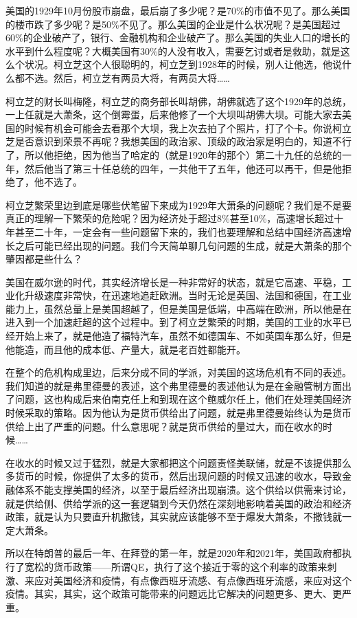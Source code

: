 \documentclass[UTF8, 12pt, a4paper]{ctexrep}
\begin{document}
美国的1929年10月份股市崩盘，最后崩了多少呢？是70\%的市值不见了。那么美国的楼市跌了多少呢？是50\%不见了。那么美国的企业是什么状况呢？是美国超过60\%的企业破产了，银行、金融机构和企业破产了。那么美国的失业人口的增长的水平到什么程度呢？大概美国有30\%的人没有收入，需要乞讨或者是救助，就是这么个状况。柯立芝这个人很聪明的，柯立芝到1928年的时候，别人让他选，他说什么都不选。然后，柯立芝有两员大将，有两员大将……

柯立芝的财长叫梅隆，柯立芝的商务部长叫胡佛，胡佛就选了这个1929年的总统，一上任就是大萧条，这个倒霉蛋，后来他修了一个大坝叫胡佛大坝。可能大家去美国的时候有机会可能会去看那个大坝，我上次去拍了个照片，打了个卡。你说柯立芝是否意识到荣景不再呢？我想美国的政治家、顶级的政治家是明白的，知道不行了，所以他拒绝，因为他当了哈定的（就是1920年的那个）第二十九任的总统的一年，然后他当了第三十任总统的四年，一共他干了五年，他还可以再干，但是他拒绝了，他不选了。

柯立芝繁荣里边到底是哪些伏笔留下来成为1929年大萧条的问题呢？我们是不是要真正的理解一下繁荣的危险呢？因为经济处于超过8\%甚至10\%，高速增长超过十年甚至二十年，一定会有一些问题留下来的，我们也要理解和总结中国经济高速增长之后可能已经出现的问题。我们今天简单聊几句问题的生成，就是大萧条的那个肇因都是些什么？

美国在威尔逊的时代，其实经济增长是一种非常好的状态，就是它高速、平稳，工业化升级速度非常快，在迅速地追赶欧洲。当时无论是英国、法国和德国，在工业能力上，虽然总量上是美国超越了，但是美国是低端，中高端在欧洲，所以他是在进入到一个加速赶超的这个过程中。到了柯立芝繁荣的时期，美国的工业的水平已经开始上来了，就是他造了福特汽车，虽然不如德国车、不如英国车那么好，但是他能造，而且他的成本低、产量大，就是老百姓都能开。

在整个的危机构成里边，后来分成不同的学派，对美国的这场危机有不同的表述。我们知道的就是弗里德曼的表述，这个弗里德曼的表述他认为是在金融管制方面出了问题，这也构成后来伯南克任上和到现在这个鲍威尔任上，他们在处理美国经济时候采取的策略。因为他认为是货币供给出了问题，就是弗里德曼始终认为是货币供给上出了严重的问题。什么意思呢？就是货币供给的量过大，而在收水的时候……

在收水的时候又过于猛烈，就是大家都把这个问题责怪美联储，就是不该提供那么多货币的时候，你提供了太多的货币，然后出现问题的时候又迅速的收水，导致金融体系不能支撑美国的经济，以至于最后经济出现崩溃。这个供给以供需来讨论，就是供给侧、供给学派的这一套逻辑到今天仍然在深刻地影响着美国的政治和经济政策，就是认为只要直升机撒钱，其实就应该能够不至于爆发大萧条，不撒钱就一定大萧条。

所以在特朗普的最后一年、在拜登的第一年，就是2020年和2021年，美国政府都执行了宽松的货币政策——所谓QE，执行了这个接近于零的这个利率的政策来刺激、来应对美国经济和疫情，有点像西班牙流感、有点像西班牙流感，来应对这个疫情。其实，其实，这个政策可能带来的问题远比它解决的问题更多、更大、更严重。
\end{document}
